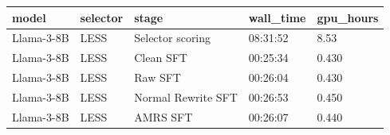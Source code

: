 \begin{tabular}{lllll}
\toprule
model & selector & stage & wall\_time & gpu\_hours \\
\midrule
Llama-3-8B & LESS & Selector scoring & 08:31:52 & 8.53 \\
Llama-3-8B & LESS & Clean SFT & 00:25:34 & 0.430 \\
Llama-3-8B & LESS & Raw SFT & 00:26:04 & 0.430 \\
Llama-3-8B & LESS & Normal Rewrite SFT & 00:26:53 & 0.450 \\
Llama-3-8B & LESS & AMRS SFT & 00:26:07 & 0.440 \\
\bottomrule
\end{tabular}
